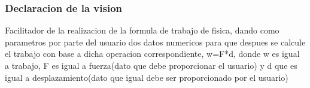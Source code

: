 \begin{frame}
\frametitle{Declaracion de la vision} 
Facilitador de la realizacion de la formula de trabajo de fisica, dando como parametros por parte del usuario dos datos numericos para que despues se calcule el trabajo con base a dicha operacion correspondiente, w=F*d, donde w es igual a trabajo, F es igual a fuerza(dato que debe proporcionar el usuario) y d que es igual a desplazamiento(dato que igual debe ser proporcionado por el usuario)
\tableofcontents 
\end{frame}